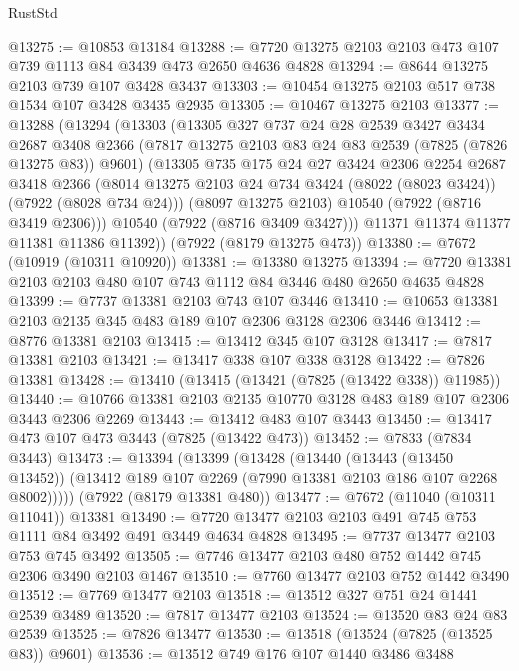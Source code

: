 \begin{lexlean}{RustStd}
\begin{coremodule}
@13275 := @10853 @13184
@13288 := @7720 @13275 @2103 @2103 @473 @107 @739 @1113 @84 @3439 @473 @2650 @4636 @4828
@13294 := @8644 @13275 @2103 @739 @107 @3428 @3437
@13303 := @10454 @13275 @2103 @517 @738 @1534 @107 @3428 @3435 @2935
@13305 := @10467 @13275 @2103
@13377 := @13288
    (@13294
      (@13303
        (@13305
          @327
          @737
          @24
          @28
          @2539
          @3427
          @3434
          @2687
          @3408
          @2366
          (@7817 @13275 @2103 @83 @24 @83 @2539 (@7825 (@7826 @13275 @83)) @9601)
          (@13305
            @735
            @175
            @24
            @27
            @3424
            @2306
            @2254
            @2687
            @3418
            @2366
            (@8014 @13275 @2103 @24 @734 @3424 (@8022 (@8023 @3424)) (@7922 (@8028 @734 @24)))
            (@8097 @13275 @2103)
            @10540
            (@7922 (@8716 @3419 @2306)))
          @10540
          (@7922 (@8716 @3409 @3427)))
        @11371
        @11374
        @11377
        @11381
        @11386
        @11392))
    (@7922 (@8179 @13275 @473))
@13380 := @7672 (@10919 (@10311 @10920))
@13381 := @13380 @13275
@13394 := @7720 @13381 @2103 @2103 @480 @107 @743 @1112 @84 @3446 @480 @2650 @4635 @4828
@13399 := @7737 @13381 @2103 @743 @107 @3446
@13410 := @10653 @13381 @2103 @2135 @345 @483 @189 @107 @2306 @3128 @2306 @3446
@13412 := @8776 @13381 @2103
@13415 := @13412 @345 @107 @3128
@13417 := @7817 @13381 @2103
@13421 := @13417 @338 @107 @338 @3128
@13422 := @7826 @13381
@13428 := @13410 (@13415 (@13421 (@7825 (@13422 @338)) @11985))
@13440 := @10766 @13381 @2103 @2135 @10770 @3128 @483 @189 @107 @2306 @3443 @2306 @2269
@13443 := @13412 @483 @107 @3443
@13450 := @13417 @473 @107 @473 @3443 (@7825 (@13422 @473))
@13452 := @7833 (@7834 @3443)
@13473 := @13394
    (@13399
      (@13428
        (@13440
          (@13443 (@13450 @13452))
          (@13412 @189 @107 @2269 (@7990 @13381 @2103 @186 @107 @2268 @8002)))))
    (@7922 (@8179 @13381 @480))
@13477 := @7672 (@11040 (@10311 @11041)) @13381
@13490 := @7720 @13477 @2103 @2103 @491 @745 @753 @1111 @84 @3492 @491 @3449 @4634 @4828
@13495 := @7737 @13477 @2103 @753 @745 @3492
@13505 := @7746 @13477 @2103 @480 @752 @1442 @745 @2306 @3490 @2103 @1467
@13510 := @7760 @13477 @2103 @752 @1442 @3490
@13512 := @7769 @13477 @2103
@13518 := @13512 @327 @751 @24 @1441 @2539 @3489
@13520 := @7817 @13477 @2103
@13524 := @13520 @83 @24 @83 @2539
@13525 := @7826 @13477
@13530 := @13518 (@13524 (@7825 (@13525 @83)) @9601)
@13536 := @13512 @749 @176 @107 @1440 @3486 @3488

\end{coremodule}
\end{lexlean}
